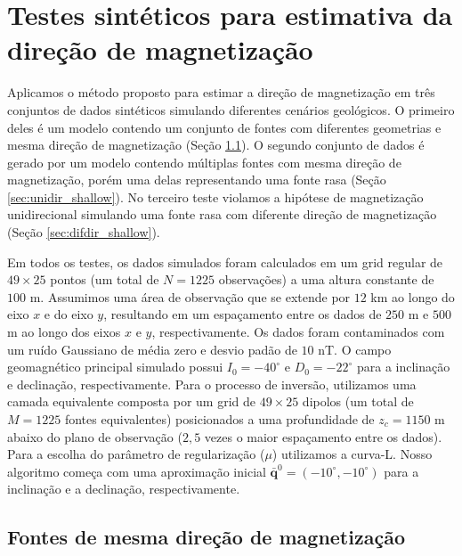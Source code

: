 \chapter{Testes sintéticos para estimativa da direção de magnetização}
\label{chap:synt_tests}

Aplicamos o método proposto para estimar a direção de magnetização em três conjuntos de dados sintéticos simulando diferentes cenários geológicos. O primeiro deles é um modelo contendo um conjunto de fontes com diferentes geometrias e mesma direção de magnetização (Seção \ref{sec:unidir_model}). O segundo conjunto de dados é gerado por um modelo contendo múltiplas fontes com mesma direção de magnetização, porém uma delas representando uma fonte rasa (Seção \ref{sec:unidir_shallow}). No terceiro teste violamos a hipótese de magnetização unidirecional simulando uma fonte rasa com diferente direção de magnetização (Seção \ref{sec:difdir_shallow}).  

Em todos os testes, os dados simulados foram calculados em um grid regular de $49 \times 25$ pontos (um total de $N = 1225$ observações) a uma altura constante de $100$ m. Assumimos uma área de observação que se extende por $12$ km ao longo do eixo $x$ e do eixo $y$, resultando em um espaçamento entre os dados de $250$ m e $500$ m ao longo dos eixos $x$ e $y$, respectivamente. Os dados foram contaminados com um ruído Gaussiano de média zero e desvio padão de $10$ nT. O campo geomagnético principal simulado possui $I_0 = -40^\circ$ e $D_0 = -22^\circ$ para a inclinação e declinação, respectivamente. Para o processo de inversão, utilizamos uma camada equivalente composta por um grid de $49 \times 25$ dipolos (um total de $M = 1225$ fontes equivalentes) posicionados a uma profundidade de $z_c = 1150$ m abaixo do plano de observação ($2,5$ vezes o maior espaçamento entre os dados). Para a escolha do parâmetro de regularização ($\mu$) utilizamos a curva-L. Nosso algoritmo começa com uma aproximação inicial $\bar{\mathbf{q}}^{0} = (-10^\circ,-10^\circ)$ para a inclinação e a declinação, respectivamente. 

\section{Fontes de mesma direção de magnetização}
\label{sec:unidir_model}

